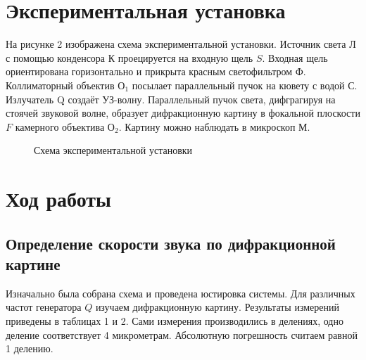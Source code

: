 \documentclass[a4paper,12pt]{article} %
\begin{document}
\section{Экспериментальная установка}
На рисунке 2 изображена схема экспериментальной установки. Источник света Л с помощью конденсора К проецируется на входную щель $S$. Входная щель ориентирована горизонтально и прикрыта красным светофильтром Ф. Коллиматорный объектив $\text{О}_1$ посылает параллельный пучок на кювету с водой $С$. Излучатель Q создаёт УЗ-волну. Параллельный пучок света, дифграгируя на стоячей звуковой волне, образует дифракционную картину в фокальной плоскости $F$ камерного объектива $\text{О}_{2}$. Картину можно наблюдать в микроскоп М.
\begin{figure}[H]
  \caption{Схема экспериментальной установки}
	\label{fig:image1}
\end{figure}
\section{Ход работы}
\subsection{Определение скорости звука по дифракционной картине}
Изначально была собрана схема и проведена юстировка системы. Для различных частот генератора $Q$ изучаем дифракционную картину. Результаты измерений приведены в таблицах 1 и 2. Сами измерения производились в делениях, одно деление соответствует 4 микрометрам. Абсолютную погрешность считаем равной 1 делению.
\end{document}
